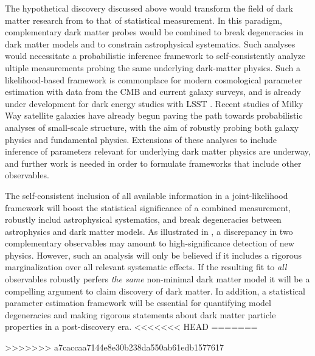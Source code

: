 The hypothetical discovery discussed above would transform the field of dark matter research from to that of statistical measurement.
In this paradigm, complementary dark matter probes would be combined to break degeneracies in dark matter models and to constrain astrophysical systematics.
Such analyses would necessitate a probabilistic inference framework to self-consistently analyze ultiple measurements probing the same underlying dark-matter physics. 
Such a likelihood-based framework is commonplace for modern cosmological parameter estimation with data from the CMB and current galaxy surveys, and is already under development for dark energy studies with LSST \citep{DESC:CCL}. 
Recent studies of Milky Way satellite galaxies \citep[\eg][]{Jethwa:2018,Nadler:2018} have already begun paving the path towards probabilistic analyses of small-scale structure, with the aim of robustly probing both galaxy physics and fundamental physics. 
Extensions of these analyses to include inference of parameters relevant for underlying dark matter physics are underway, and further work is needed in order to formulate frameworks that include other observables. 

The self-consistent inclusion of all available information in a joint-likelihood framework will boost the statistical significance of a combined measurement, robustly includ astrophysical systematics, and break degeneracies between astrophysics and dark matter models.
As illustrated in , a discrepancy in two complementary observables may amount to high-significance detection of new physics. 
However, such an analysis will only be believed if it includes a rigorous marginalization over all relevant systematic effects. 
If the resulting fit to \textit{all} observables robustly perfers \emph{the same} non-minimal dark matter model it will be a compelling argument to claim discovery of dark matter. 
In addition, a statistical parameter estimation framework will be essential for quantifying model degeneracies and making rigorous statements about dark matter particle properties in a post-discovery era.
<<<<<<< HEAD
=======

>>>>>>> a7caccaa7144e8e30b238da550ab61edb1577617

